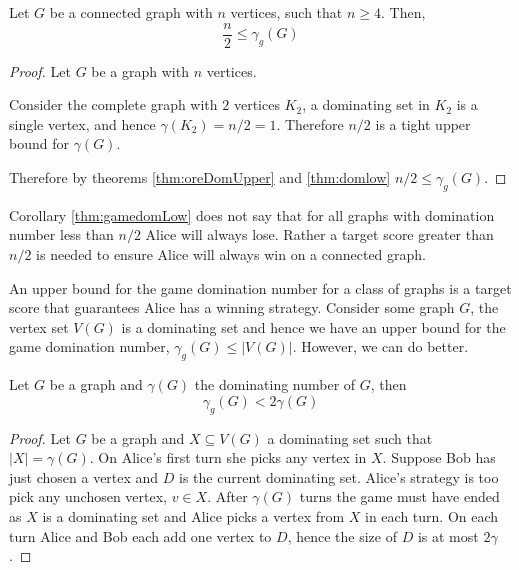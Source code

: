 
\begin{corollary} \label{thm:gamedomLow}
    Let $G$ be a connected graph with $n$ vertices, such that $n \geq 4$. Then,    
    \[  \frac{n}{2} \leq \gamma_g(G)  \]    
\end{corollary}

\begin{proof}
    Let $G$ be a graph with $n$ vertices.
    
    Consider the complete graph with $2$ vertices $K_2$, a dominating set in $K_2$ is a single vertex, and hence $\gamma(K_2)=n/2=1$. Therefore $n/2$ is a tight upper bound for $\gamma(G)$. 
    
    Therefore by theorems \ref{thm:oreDomUpper} and \ref{thm:domlow} $ n/2 \leq \gamma_g(G)$.
\end{proof}

Corollary \ref{thm:gamedomLow} does not say that for all graphs with domination number less than $n/2$ Alice will always lose. Rather a target score greater than $n/2$ is needed to ensure Alice will always win on a connected graph.


An upper bound for the game domination number for a class of graphs is a target score that guarantees Alice has a winning strategy. Consider some graph $G$, the vertex set $V(G)$ is a dominating set and hence we have an upper bound for the game domination number, $\gamma_g(G) \leq |V(G)|$. However, we can do better.

\begin{theorem}\label{thm:gamedomup}
    Let $G$ be a graph and $\gamma(G)$ the dominating number of $G$, then 
    \[\gamma_g(G)<2\gamma(G)\]
\end{theorem}
\begin{proof}
    Let $G$ be a graph and $X\subseteq V(G)$ a dominating set such that $|X| = \gamma(G)$. On Alice's first turn she picks any vertex in $X$. Suppose Bob has just chosen a vertex and $D$ is the current dominating set. Alice's strategy is too pick any unchosen vertex, $v\in X$. After $\gamma(G)$ turns the game must have ended as $X$ is a dominating set and Alice picks a vertex from $X$ in each turn. On each turn Alice and Bob each add one vertex to $D$, hence the size of $D$ is at most $2\gamma$.
\end{proof}

